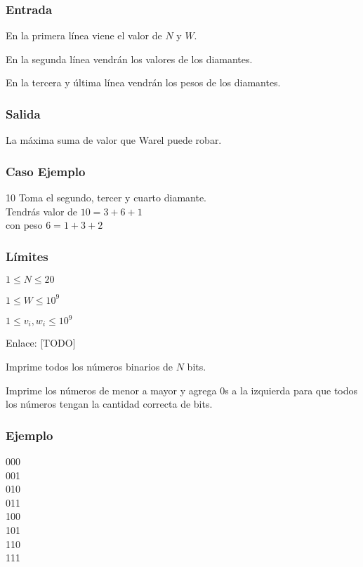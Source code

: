 \subsubsection*{Entrada}
En la primera línea viene el valor de \(N\) y \(W\).

En la segunda línea vendrán los valores de los diamantes.

En la tercera y última línea vendrán los pesos de los diamantes.
\subsubsection*{Salida}
La máxima suma de valor que Warel puede robar.

\subsubsection*{Caso Ejemplo} 
\begin{casebox3}
	{10}
	{
		Toma el segundo, tercer y cuarto diamante. \\
		Tendrás valor de \(10=3+6+1\) \\
		con peso \(6=1+3+2\)
	}
\end{casebox3}

\subsubsection*{Límites}

\begin{plimits}
	\item \(1\leq N\leq 20 \)
	\item \(1\leq W\leq 10^9 \)
	\item \(1\leq v_i, w_i\leq 10^9 \)
\end{plimits}

Enlace: [TODO]

\problembreak

\problemtitle Imprime todos los números binarios de \(N\) bits. 

Imprime los números de menor a mayor y agrega 0s a la izquierda para que todos los números tengan la cantidad correcta de bits.

\subsubsection*{Ejemplo}
\begin{casebox2}
	{
		000 \\
	  	001 \\
	  	010 \\
	  	011 \\
	  	100 \\
	  	101 \\
	  	110 \\
	  	111 \\
	}
	\hline
\end{casebox2}

